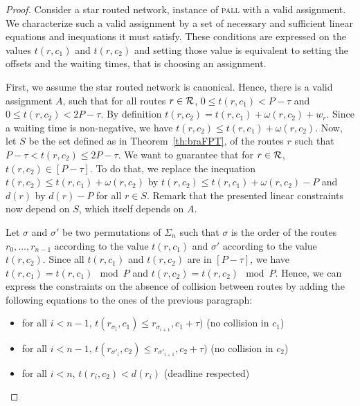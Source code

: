 \documentclass[a4paper,10pt]{journal}
\newcommand\pall{\textsc{pall}\xspace}
\begin{document}
\begin{proof}
 Consider a star routed network, instance of \pall with a valid assignment. We characterize such a valid assignment by a set of necessary and sufficient linear equations and inequations it must satisfy.  These conditions are expressed on the values $t(r,c_1)$ and $t(r,c_2)$ and setting those value is equivalent to setting the offsets and the waiting times, that is choosing an assignment.

First, we assume the star routed network is canonical. Hence, there is a valid assignment $A$, such that for all routes $r \in \cal{R}$, $0 \leq t(r,c_1) < P -\tau$ and $0 \leq t(r,c_2) < 2P-\tau$. 
By definition $t(r,c_2) = t(r,c_1) + \omega(r,c_2) + w_r$. Since a waiting time is non-negative, we have $t(r,c_2) \leq t(r,c_1) + \omega(r,c_2)$. 
Now, let $S$ be the set defined as in Theorem~\ref{th:braFPT}, of the routes $r$ such that  $P - \tau < t(r,c_2) \leq 2P - \tau$. We want to guarantee that for $r \in \cal{R}$, $t(r,c_2) \in [P-\tau]$.
To do that, we replace the inequation $t(r,c_2) \leq t(r,c_1) + \omega(r,c_2)$ by $t(r,c_2) \leq t(r,c_1) + \omega(r,c_2) - P$ and $d(r)$ by $d(r) - P$ for all $r \in S$. Remark that the presented linear constraints now depend on $S$, which itself depends on $A$.

 Let $\sigma$ and $\sigma'$ be two permutations of $\Sigma_n$ such that $\sigma$ is the order 
 of the routes $r_0,\dots, r_{n-1}$ according to the value $t(r,c_1)$ and $\sigma'$ according to the value $t(r,c_2)$.  Since all $t(r,c_1)$ and $t(r,c_2)$ are in $[P-\tau]$, we have $t(r,c_1) = t(r,c_1) \mod P $ and $t(r,c_2) = t(r,c_2) \mod P $. Hence, we can express the constraints on the absence of collision between routes by adding the following equations to the ones of the previous paragraph:
 
 \begin{itemize}
 	\item for all $i < n-1$, $t(r_{\sigma_{i}},c_1) \leq r_{\sigma_{i+1}},c_1 + \tau)$ (no collision in $c_1$)
 	\item for all $i < n-1$, $t(r_{\sigma'_{i}},c_2) \leq r_{\sigma'_{i+1}},c_2 + \tau)$ (no collision in $c_2$)
 	\item for all $i < n$,  $t(r_{i},c_2) < d(r_i)$ (deadline respected)
 \end{itemize}


\end{proof}
\end{document}
